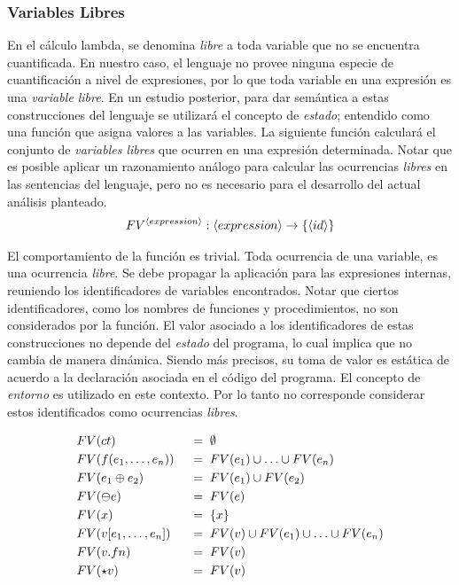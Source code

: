 \subsubsection{Variables Libres}

En el cálculo lambda, se denomina \textit{libre} a toda variable que no se encuentra cuantificada.
En nuestro caso, el lenguaje no provee ninguna especie de cuantificación a nivel de expresiones, por lo que toda variable en una expresión es una \textit{variable libre}.
En un estudio posterior, para dar semántica a estas construcciones del lenguaje se utilizará el concepto de \textit{estado}; entendido como una función que asigna valores a las variables.
La siguiente función calculará el conjunto de \textit{variables libres} que ocurren en una expresión determinada.
Notar que es posible aplicar un razonamiento análogo para calcular las ocurrencias \textit{libres} en las sentencias del lenguaje, pero no es necesario para el desarrollo del actual análisis planteado.
\begin{gather*}
FV^{\langle expression \rangle}: \langle expression \rangle \rightarrow \{ \langle id \rangle \}
\end{gather*}

El comportamiento de la función es trivial.
Toda ocurrencia de una variable, es una ocurrencia \textit{libre}.
Se debe propagar la aplicación para las expresiones internas, reuniendo los identificadores de variables encontrados.
Notar que ciertos identificadores, como los nombres de funciones y procedimientos, no son considerados por la función.
El valor asociado a los identificadores de estas construcciones no depende del \textit{estado} del programa, lo cual implica que no cambia de manera dinámica.
Siendo más precisos, su toma de valor es estática de acuerdo a la declaración asociada en el código del programa.
El concepto de \textit{entorno} es utilizado en este contexto.
Por lo tanto no corresponde considerar estos identificados como ocurrencias \textit{libres}.


\begin{alignat*}{2}
&FV(ct)
&&\;=\;
\emptyset
\\
&FV(f(e_1, \ldots, e_n))
&&\;=\;
FV(e_1) \cup \ldots \cup FV(e_n)
\\
&FV(e_1 \oplus e_2)
&&\;=\;
FV(e_1) \cup FV(e_2)
\\
&FV(\ominus e)
&&\;=\;
FV(e)
\\
&FV(x)
&&\;=\;
\{ x \}
\\
&FV(v [e_1, \ldots, e_n])
&&\;=\;
FV(v) \cup FV(e_1) \cup \ldots \cup FV(e_n)
\\
&FV(v.fn)
&&\;=\;
FV(v)
\\
&FV(\star v)
&&\;=\;
FV(v)
\end{alignat*}

